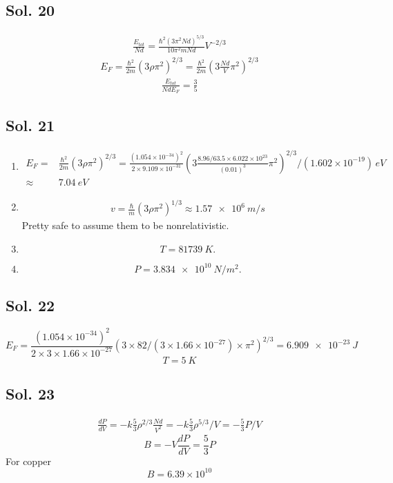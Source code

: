    \subsection*{Sol. 20}
   \begin{align*}
       \frac{E_{tot}}{Nd}=
       \frac{\hbar^2(3\pi^2Nd)^{5/3}}{10\pi^2mNd}V^{-2/3}
   \end{align*}
   \begin{align*}
       E_F = \frac{\hbar^2}{2m}(3\rho\pi^2)^{2/3}
       =\frac{\hbar^2}{2m}(3\frac{Nd}{V}\pi^2)^{2/3}
   \end{align*}
   \begin{align*}
       \frac{E_{tot}}{NdE_F}
       =
       \frac{3}{5}
   \end{align*}

   \subsection*{Sol. 21}
   \begin{enumerate}
       \item 
       \begin{align*}
           E_F=&\frac{\hbar^2}{2m}(3\rho\pi^2)^{2/3}
           =\frac{(1.054\times10^{-34})^2}{2\times9.109\times10^{-31}}
           (3\frac{8.96/63.5\times 6.022\times10^{23}}{(0.01)^3}\pi^2)^{2/3}
           /(1.602\times 10^{-19})\,\unit{eV}\\
           \approx &\qty{7.04}{eV}
       \end{align*}
       \item 
       \begin{align*}
           v = \frac{\hbar}{m}(3\rho\pi^2)^{1/3}\approx \qty{1.57e6}{m/s}
       \end{align*}
       Pretty safe to assume them to be nonrelativistic.
       \item $$T=\qty{81739}{K}.$$
       \item 
       $$
       P = \qty{3.834e10}{N/m^2}.
       $$
   \end{enumerate}

   \subsection*{Sol. 22}
    $$
    E_F=\frac{(1.054\times 10^{-34})^2}
    {2\times3\times 1.66\times10^{-27}}
    (3\times82/(3\times 1.66\times10^{-27})\times\pi^2)^{2/3}
    =\qty{6.909e-23}{J}
    $$
    $$
    T = \qty{5}{K}
    $$

   \subsection*{Sol. 23}
   \begin{align*}
       \frac{dP}{dV}
       =-k\frac{5}{3}\rho^{2/3}\frac{Nd}{V^2}
       =-k\frac{5}{3}\rho^{5/3}/V
       =-\frac{5}{3}P/V
   \end{align*}
   $$
   B = -V\frac{dP}{dV}
   =\frac{5}{3}P
   $$
   For copper 
   $$
   B = 6.39\times10^{10}
   $$

